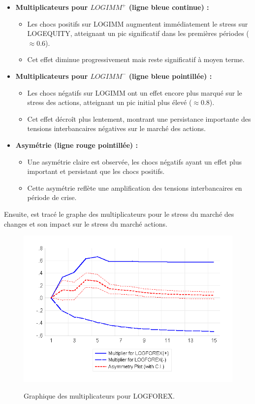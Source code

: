 \begin{itemize}
    \item \textbf{Multiplicateurs pour $LOGIMM^+$ (ligne bleue continue) :}
    \begin{itemize}
        \item Les chocs positifs sur LOGIMM augmentent immédiatement le stress sur LOGEQUITY, atteignant un pic significatif dans les premières périodes (\(\approx 0.6\)).
        \item Cet effet diminue progressivement mais reste significatif à moyen terme.
    \end{itemize}

    \item \textbf{Multiplicateurs pour $LOGIMM^-$ (ligne bleue pointillée) :}
    \begin{itemize}
        \item Les chocs négatifs sur LOGIMM ont un effet encore plus marqué sur le stress des actions, atteignant un pic initial plus élevé (\(\approx 0.8\)).
        \item Cet effet décroît plus lentement, montrant une persistance importante des tensions interbancaires négatives sur le marché des actions.
    \end{itemize}

    \item \textbf{Asymétrie (ligne rouge pointillée) :}
    \begin{itemize}
        \item Une asymétrie claire est observée, les chocs négatifs ayant un effet plus important et persistant que les chocs positifs.
        \item Cette asymétrie reflète une amplification des tensions interbancaires en période de crise.
    \end{itemize}
\end{itemize}

Ensuite, est tracé le graphe des multiplicateurs pour le stress du marché des changes et son impact sur le stress du marché actions.

\begin{figure}[H]
    \centering
    \caption{Graphique des multiplicateurs pour LOGFOREX.}
    \includegraphics{figures/multiplier_logforex.png}
    \label{fig:multiplier_logforex}
\end{figure}

